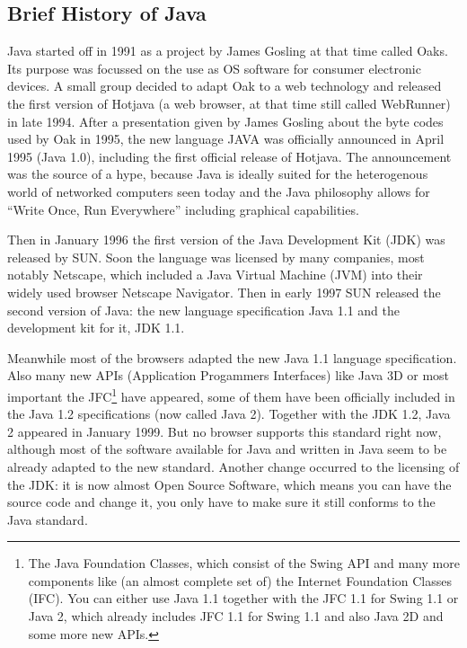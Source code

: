 \subsection{Brief History of Java}
Java started off in 1991 as a project by James Gosling at that time called
Oaks. Its purpose was focussed on the use as OS software for consumer
electronic devices. A small group decided to adapt Oak to a web
technology and released the first version of Hotjava (a web browser, at that
time still called WebRunner)
in late 1994. After a presentation given by James Gosling about the 
byte codes used by Oak in 1995, the new language JAVA was officially 
announced in April 1995 (Java 1.0), 
including the first official release of Hotjava.
The announcement was the source of a hype, because Java is ideally
suited for the heterogenous world of networked computers seen today and
the Java philosophy allows for ``Write Once, Run Everywhere'' including
graphical capabilities.

Then in January 1996 the first version of the Java Development Kit (JDK) 
was released by SUN. Soon the language was licensed by many companies,
most notably Netscape, which included a Java Virtual Machine (JVM) into
their widely used browser Netscape Navigator. Then in early 1997
SUN released the second version of Java: the new language specification 
Java 1.1 and the development kit for it, JDK 1.1.

Meanwhile most of the browsers adapted the new Java 1.1 language specification.
Also many new APIs (Application Progammers Interfaces) like Java 3D or 
most important the JFC\footnote{The Java Foundation Classes, which
consist of the Swing API and many more components like (an 
almost complete set of)  
the Internet Foundation Classes (IFC). You can either use Java 1.1 together
with the JFC 1.1 for Swing 1.1 or Java 2, which already includes JFC 1.1 for
Swing 1.1 and also Java 2D and some more new APIs.}
have appeared, some
of them have been officially included in the Java 1.2 specifications
(now called Java 2). Together with the JDK 1.2, Java 2 appeared in January 1999.
But no browser supports this standard right now, although most
of the software available for Java and written in Java seem to be
already adapted to the new standard. Another change occurred to the
licensing of the JDK: it is now almost Open Source Software, which
means you can have the source code and change it, you only have to make
sure it still conforms to the Java standard.

